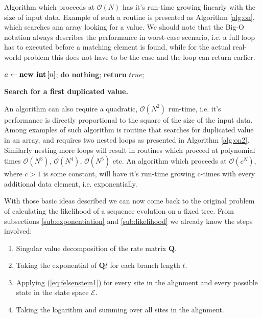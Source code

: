 \documentclass[12pt,twoside]{mitthesis}
\theoremstyle{plain}
\theoremstyle{definition}
\theoremstyle{remark}
\begin{document}
Algorithm which proceeds at $\mathcal{O}\left(N\right)$ has it's run-time growing linearly with the size of input data.
Example of such a routine is presented as Algorithm \ref{alg:on}, which searches ana array looking for a value.
We should note that the Big-O notation always describes the performance in worst-case scenario, i.e. a full loop has to executed before a matching element is found, while for the actual real-world problem this does not have to be the case and the loop can return earlier.

\begin{algorithm}
\begin{center}
\begin{algorithmic}[1]
\footnotesize{
\State $a \gets \text{\textbf{new int}}\left[n\right]$;
%
%
%
%
\State \textbf{do nothing};
%
\Else 
%
%
\State \textbf{return} $true$;
%
\EndIf
%
\EndIf {}
%
\EndFor {}
%
\EndFor {}
}
\end{algorithmic}
\end{center}
\caption{{ \footnotesize {\bf Search for a first duplicated value.} 
}}
\label{alg:on2}
\end{algorithm}

An algorithm can also require a quadratic, $\mathcal{O}\left(N^2\right)$ run-time, i.e. it's performance is directly proportional to the square of the size of the input data.
Among examples of such algorithm is routine that searches for duplicated value in an array, and requires two nested loops as presented in Algorithm \ref{alg:on2}.
Similarly nesting more loops will result in routines which proceed at polynomial times $\mathcal{O}\left(N^3\right)$, $\mathcal{O}\left(N^4\right)$, $\mathcal{O}\left(N^5\right)$ etc.
An algorithm which proceeds at $\mathcal{O}\left(c^N\right)$, where $c>1$ is some constant, will have it's run-time growing c-times with every additional data element, i.e. exponentially. 

With those basic ideas described we can now come back to the original problem of calculating the likelihood of a sequence evolution on a fixed tree.
From subsections \ref{sub:exponentiation} and \ref{sub:likelihood} we already know the steps involved:

\begin{enumerate}
\item { Singular value decomposition of the rate matrix $\mathbf{Q}$. }
\item { Taking the exponential of $\mathbf{Q}t$ for each branch length $t$. }
\item { Applying (\ref{eq:felsenstein1}) for every site in the alignment and every possible state in the state space $\mathcal{E}$. }
\item { Taking the logarithm and summing over all sites in the alignment. }
\end{enumerate}
\end{document}
